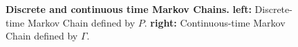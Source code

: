 \begin{figure}[h]
	\centering
	\caption[Discrete and continuous time Markov Chains.]{\textbf{Discrete and continuous time Markov Chains.} \textbf{left:} Discrete-time Markov Chain defined by $P$. \textbf{right:} Continuous-time Markov Chain defined by $\Gamma$.}
	\label{fig:mc-diagrams}
\end{figure}


